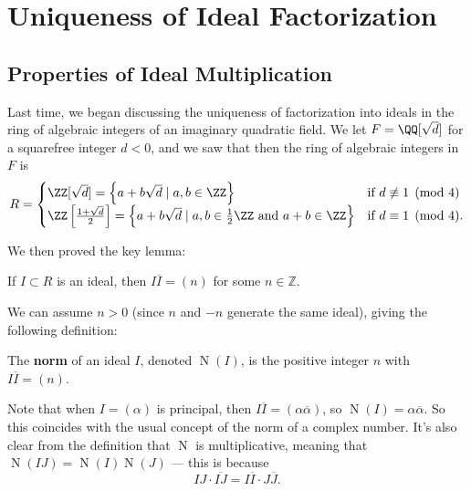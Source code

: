 

\section{Uniqueness of Ideal Factorization}

\subsection{Properties of Ideal Multiplication}

Last time, we began discussing the uniqueness of factorization into ideals in the ring of algebraic integers of an imaginary quadratic field. We let $F = \QQ[\sqrt{d}]$ for a squarefree integer $d < 0$, and we saw that then the ring of algebraic integers in $F$ is \[R = \begin{cases} \ZZ[\sqrt{d}] = \left\{a + b\sqrt{d} \mid a, b \in \ZZ\right\} & \text{if $d \not\equiv 1 \pmod{4}$} \\ \ZZ\left[\frac{1 + \sqrt{d}}{2}\right] = \left\{a + b\sqrt{d} \mid a, b \in \frac{1}{2}\ZZ \text{ and } a + b \in \ZZ\right\} & \text{if $d \equiv 1 \pmod{4}$}.\end{cases}\] 

We then proved the key lemma:

\begin{lemma} \label{IconjI principal}
    If $I \subset R$ is an ideal, then $I\overline{I} = (n)$ for some $n \in \mathbb{Z}$. 
\end{lemma}

We can assume $n > 0$ (since $n$ and $-n$ generate the same ideal), giving the following definition:

\begin{definition}
The \textbf{norm} of an ideal $I$, denoted $\operatorname{N}(I)$, is the positive integer $n$ with $I\overline{I} = (n)$. 
\end{definition}

Note that when $I = (\alpha)$ is principal, then $I\overline{I} = (\alpha\overline{\alpha})$, so $\operatorname{N}(I) = \alpha\overline{\alpha}$. So this coincides with the usual concept of the norm of a complex number. It's also clear from the definition that $\operatorname{N}$ is multiplicative, meaning that $\operatorname{N}(IJ) = \operatorname{N}(I)\operatorname{N}(J)$ --- this is because \[IJ\cdot \overline{IJ} = I\overline{I} \cdot J\overline{J}.\]  

